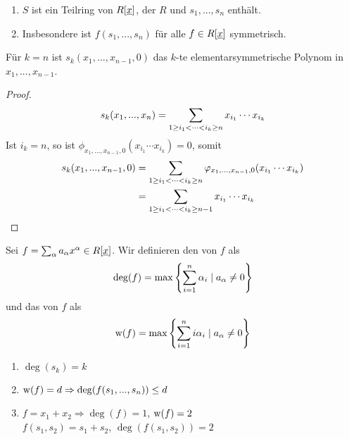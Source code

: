 \begin{remark}
	\begin{enumerate}[label=(\alph*)]
		\item $S$ ist ein Teilring von $R[\uline{x}]$, der $R$ und $s_1,...,s_n$ enthält.
		\item Insbesondere ist $f(s_1,...,s_n)$ für alle $f\in R[\uline{x}]$ symmetrisch.
	\end{enumerate}
\end{remark}

\begin{lemma}
	Für $k=n$ ist $s_k(x_1,...,x_{n-1},0)$ das $k$-te elementarsymmetrische Polynom in $x_1,...,x_{n-1}$.
\end{lemma}
\begin{proof}
	\begin{align}
		s_k(x_1,...,x_n) = \sum_{1\ge i_1<\dots< i_k\ge n} x_{i_1}\cdots x_{i_k}\notag
	\end{align}
	Ist $i_k=n$, so ist $\phi_{x_1,...,x_{n-1},0}(x_{i_1}\cdots x_{i_k})=0$, somit
	\begin{align}
		s_k(x_1,...,x_{n-1},0) &= \sum_{1\ge i_1<\dots< i_k\ge n} \phi_{x_1,...,x_{n-1},0}(x_{i_1}\cdots x_{i_k}) \notag \\
		&= \sum_{1\ge i_1<\dots< i_k\ge n-1} x_{i_1}\cdots x_{i_k} \notag
	\end{align}
\end{proof}

\begin{definition}
	Sei $f=\sum_\alpha a_\alpha x^\alpha\in R[\uline{x}]$. Wir definieren den  von $f$ als
	\begin{align}
		\deg(f) = \max\left\lbrace \sum_{i=1}^n \alpha_i\mid a_\alpha\neq 0\right\rbrace \notag
	\end{align}
	und das  von $f$ als
	\begin{align}
		\w(f) = \max\left\lbrace \sum_{i=1}^n i\alpha_i\mid a_\alpha\neq 0\right\rbrace \notag
	\end{align}
\end{definition}

\begin{example}
	\begin{enumerate}[label=(\alph*)]
		\item $\deg(s_k) = k$
		\item $\w(f) = d\Rightarrow \deg(f(s_1,...,s_n))\le d$
		\item $f=x_1+x_2\Rightarrow \deg(f) = 1$, $\w(f)=2$ \\
		$f(s_1,s_2) = s_1+s_2$, $\deg(f(s_1,s_2)) = 2$
	\end{enumerate}
\end{example}

